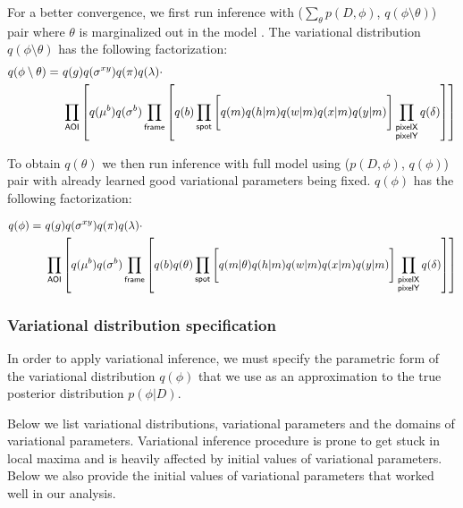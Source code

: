 For a better convergence, we first run inference with ($\sum_\theta p(D, \phi)$, $q(\phi \setminus \theta)$) pair where $\theta$ is marginalized out in the model \cite{Obermeyer2019-xt}. The variational distribution $q(\phi \setminus \theta)$ has the following factorization:
%
\begin{equation}
\begin{aligned}
    q(\phi \setminus \theta) =~&q(g) q(\sigma^{xy}) q(\pi) q(\lambda) \cdot \\
    &\prod_{\mathsf{AOI}} \left[ q(\mu^b) q(\sigma^b) \prod_{\mathsf{frame}} \left[ \vphantom{\prod_{F}} q(b) \prod_{\mathsf{spot}} \left[ \vphantom{\prod_{F}} q(m) q(h | m) q(w | m) q(x | m) q(y | m) \right] \prod_{\substack{\mathsf{pixelX} \\ \mathsf{pixelY}}} q(\delta) \right] \right]
\end{aligned}
\end{equation}

To obtain $q(\theta)$ we then run inference with full model using ($p(D, \phi)$, $q(\phi)$) pair with already learned good variational parameters being fixed. $q(\phi)$ has the following factorization:

\begin{equation}
\begin{aligned}
    q(\phi) =~&q(g) q(\sigma^{xy}) q(\pi) q(\lambda) \cdot \\
    &\prod_{\mathsf{AOI}} \left[ q(\mu^b) q(\sigma^b) \prod_{\mathsf{frame}} \left[ q(b) q(\theta) \prod_{\mathsf{spot}} \left[ \vphantom{\prod_{F}} q(m | \theta) q(h | m) q(w | m) q(x | m) q(y | m) \right] \prod_{\substack{\mathsf{pixelX} \\ \mathsf{pixelY}}} q(\delta) \right] \right]
\end{aligned}
\end{equation}

\subsubsection*{Variational distribution specification}

In order to apply variational inference, we must specify the parametric form of the variational distribution $q(\phi)$
that we use as an approximation to the true posterior distribution $p(\phi | D)$.

Below we list variational distributions, variational parameters and the domains of variational parameters. Variational inference procedure is prone to get stuck in local maxima and is heavily affected by initial values of variational parameters. Below we also provide the initial values of variational parameters that worked well in our analysis.

